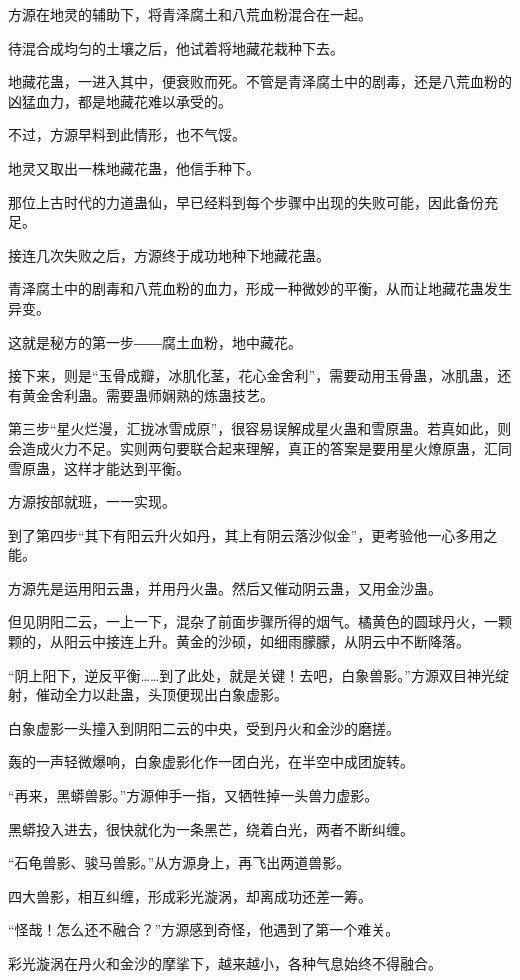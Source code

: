 \begin{this_body}
方源在地灵的辅助下，将青泽腐土和八荒血粉混合在一起。

待混合成均匀的土壤之后，他试着将地藏花栽种下去。

地藏花蛊，一进入其中，便衰败而死。不管是青泽腐土中的剧毒，还是八荒血粉的凶猛血力，都是地藏花难以承受的。

不过，方源早料到此情形，也不气馁。

地灵又取出一株地藏花蛊，他信手种下。

那位上古时代的力道蛊仙，早已经料到每个步骤中出现的失败可能，因此备份充足。

接连几次失败之后，方源终于成功地种下地藏花蛊。

青泽腐土中的剧毒和八荒血粉的血力，形成一种微妙的平衡，从而让地藏花蛊发生异变。

这就是秘方的第一步――腐土血粉，地中藏花。

接下来，则是“玉骨成瓣，冰肌化茎，花心金舍利”，需要动用玉骨蛊，冰肌蛊，还有黄金舍利蛊。需要蛊师娴熟的炼蛊技艺。

第三步“星火烂漫，汇拢冰雪成原”，很容易误解成星火蛊和雪原蛊。若真如此，则会造成火力不足。实则两句要联合起来理解，真正的答案是要用星火燎原蛊，汇同雪原蛊，这样才能达到平衡。

方源按部就班，一一实现。

到了第四步“其下有阳云升火如丹，其上有阴云落沙似金”，更考验他一心多用之能。

方源先是运用阳云蛊，并用丹火蛊。然后又催动阴云蛊，又用金沙蛊。

但见阴阳二云，一上一下，混杂了前面步骤所得的烟气。橘黄色的圆球丹火，一颗颗的，从阳云中接连上升。黄金的沙硕，如细雨朦朦，从阴云中不断降落。

“阴上阳下，逆反平衡……到了此处，就是关键！去吧，白象兽影。”方源双目神光绽射，催动全力以赴蛊，头顶便现出白象虚影。

白象虚影一头撞入到阴阳二云的中央，受到丹火和金沙的磨搓。

轰的一声轻微爆响，白象虚影化作一团白光，在半空中成团旋转。

“再来，黑蟒兽影。”方源伸手一指，又牺牲掉一头兽力虚影。

黑蟒投入进去，很快就化为一条黑芒，绕着白光，两者不断纠缠。

“石龟兽影、骏马兽影。”从方源身上，再飞出两道兽影。

四大兽影，相互纠缠，形成彩光漩涡，却离成功还差一筹。

“怪哉！怎么还不融合？”方源感到奇怪，他遇到了第一个难关。

彩光漩涡在丹火和金沙的摩挲下，越来越小，各种气息始终不得融合。


\end{this_body}
